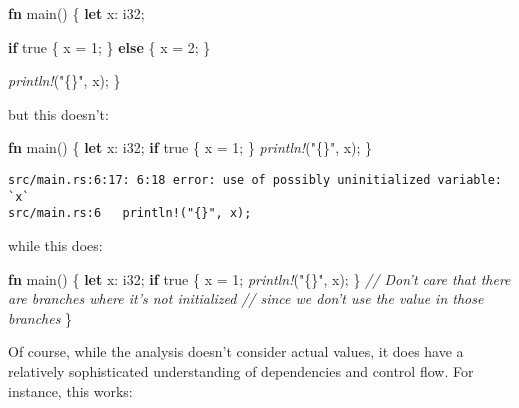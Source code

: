 \documentclass[a4paper,]{book}
\newenvironment{Shaded}{\begin{snugshade}}{\end{snugshade}}
\newcommand{\KeywordTok}[1]{\textcolor[rgb]{0.13,0.29,0.53}{\textbf{{#1}}}}
\newcommand{\DataTypeTok}[1]{\textcolor[rgb]{0.13,0.29,0.53}{{#1}}}
\newcommand{\DecValTok}[1]{\textcolor[rgb]{0.00,0.00,0.81}{{#1}}}
\newcommand{\ConstantTok}[1]{\textcolor[rgb]{0.00,0.00,0.00}{{#1}}}
\newcommand{\StringTok}[1]{\textcolor[rgb]{0.31,0.60,0.02}{{#1}}}
\newcommand{\CommentTok}[1]{\textcolor[rgb]{0.56,0.35,0.01}{\textit{{#1}}}}
\newcommand{\PreprocessorTok}[1]{\textcolor[rgb]{0.56,0.35,0.01}{\textit{{#1}}}}
\newcommand{\NormalTok}[1]{{#1}}
\begin{document}
\begin{Shaded}
\begin{Highlighting}[]
\KeywordTok{fn} \NormalTok{main() \{}
    \KeywordTok{let} \NormalTok{x: }\DataTypeTok{i32}\NormalTok{;}

    \KeywordTok{if} \ConstantTok{true} \NormalTok{\{}
        \NormalTok{x = }\DecValTok{1}\NormalTok{;}
    \NormalTok{\} }\KeywordTok{else} \NormalTok{\{}
        \NormalTok{x = }\DecValTok{2}\NormalTok{;}
    \NormalTok{\}}

    \PreprocessorTok{println!}\NormalTok{(}\StringTok{"\{\}"}\NormalTok{, x);}
\NormalTok{\}}
\end{Highlighting}
\end{Shaded}

but this doesn't:

\begin{Shaded}
\begin{Highlighting}[]
\KeywordTok{fn} \NormalTok{main() \{}
    \KeywordTok{let} \NormalTok{x: }\DataTypeTok{i32}\NormalTok{;}
    \KeywordTok{if} \ConstantTok{true} \NormalTok{\{}
        \NormalTok{x = }\DecValTok{1}\NormalTok{;}
    \NormalTok{\}}
    \PreprocessorTok{println!}\NormalTok{(}\StringTok{"\{\}"}\NormalTok{, x);}
\NormalTok{\}}
\end{Highlighting}
\end{Shaded}

\begin{verbatim}
src/main.rs:6:17: 6:18 error: use of possibly uninitialized variable: `x`
src/main.rs:6   println!("{}", x);
\end{verbatim}

while this does:

\begin{Shaded}
\begin{Highlighting}[]
\KeywordTok{fn} \NormalTok{main() \{}
    \KeywordTok{let} \NormalTok{x: }\DataTypeTok{i32}\NormalTok{;}
    \KeywordTok{if} \ConstantTok{true} \NormalTok{\{}
        \NormalTok{x = }\DecValTok{1}\NormalTok{;}
        \PreprocessorTok{println!}\NormalTok{(}\StringTok{"\{\}"}\NormalTok{, x);}
    \NormalTok{\}}
    \CommentTok{// Don't care that there are branches where it's not initialized}
    \CommentTok{// since we don't use the value in those branches}
\NormalTok{\}}
\end{Highlighting}
\end{Shaded}

Of course, while the analysis doesn't consider actual values, it does
have a relatively sophisticated understanding of dependencies and
control flow. For instance, this works:
\end{document}
